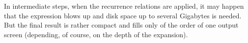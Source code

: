 In intermediate steps, when the recurrence relations are applied, it may
happen that the expression blows up and disk space up to several
Gigabytes is needed. But the final result is rather compact and fills
only of the order of one output screen (depending, of course, on the
depth of the expansion).


